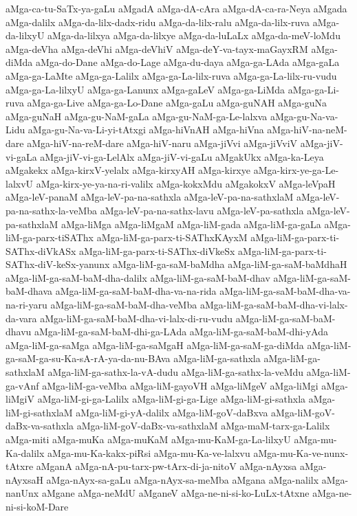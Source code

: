 {aMga-ca-tu-SaTx-ya-gaLu
aMgadA
aMga-dA-cAra
aMga-dA-ca-ra-Neya
aMgada
aMga-dalilx
aMga-da-lilx-dadx-ridu
aMga-da-lilx-ralu
aMga-da-lilx-ruva
aMga-da-lilxyU
aMga-da-lilxya
aMga-da-lilxye
aMga-da-luLaLx
aMga-da-meV-loMdu
aMga-deVha
aMga-deVhi
aMga-deVhiV
aMga-deY-va-tayx-maGayxRM
aMga-diMda
aMga-do-Dane
aMga-do-Lage
aMga-du-daya
aMga-ga-LAda
aMga-gaLa
aMga-ga-LaMte
aMga-ga-Lalilx
aMga-ga-La-lilx-ruva
aMga-ga-La-lilx-ru-vudu
aMga-ga-La-lilxyU
aMga-ga-Lanunx
aMga-gaLeV
aMga-ga-LiMda
aMga-ga-Li-ruva
aMga-ga-Live
aMga-ga-Lo-Dane
aMga-gaLu
aMga-guNAH
aMga-guNa
aMga-guNaH
aMga-gu-NaM-gaLa
aMga-gu-NaM-ga-Le-lalxva
aMga-gu-Na-va-Lidu
aMga-gu-Na-va-Li-yi-tAtxgi
aMga-hiVnAH
aMga-hiVna
aMga-hiV-na-neM-dare
aMga-hiV-na-reM-dare
aMga-hiV-naru
aMga-jiVvi
aMga-jiVviV
aMga-jiV-vi-gaLa
aMga-jiV-vi-ga-LelAlx
aMga-jiV-vi-gaLu
aMgakUkx
aMga-ka-Leya
aMgakekx
aMga-kirxV-yelalx
aMga-kirxyAH
aMga-kirxye
aMga-kirx-ye-ga-Le-lalxvU
aMga-kirx-ye-ya-na-ri-valilx
aMga-kokxMdu
aMgakokxV
aMga-leVpaH
aMga-leV-panaM
aMga-leV-pa-na-sathxla
aMga-leV-pa-na-sathxlaM
aMga-leV-pa-na-sathx-la-veMba
aMga-leV-pa-na-sathx-lavu
aMga-leV-pa-sathxla
aMga-leV-pa-sathxlaM
aMga-liMga
aMga-liMgaM
aMga-liM-gada
aMga-liM-ga-gaLa
aMga-liM-ga-parx-tiSAThx
aMga-liM-ga-parx-ti-SAThxKAyxM
aMga-liM-ga-parx-ti-SAThx-diVkASx
aMga-liM-ga-parx-ti-SAThx-diVkeSx
aMga-liM-ga-parx-ti-SAThx-diV-keSx-yanunx
aMga-liM-ga-saM-baMdha
aMga-liM-ga-saM-baMdhaH
aMga-liM-ga-saM-baM-dha-dalilx
aMga-liM-ga-saM-baM-dhav
aMga-liM-ga-saM-baM-dhava
aMga-liM-ga-saM-baM-dha-va-na-rida
aMga-liM-ga-saM-baM-dha-va-na-ri-yaru
aMga-liM-ga-saM-baM-dha-veMba
aMga-liM-ga-saM-baM-dha-vi-lalx-da-vara
aMga-liM-ga-saM-baM-dha-vi-lalx-di-ru-vudu
aMga-liM-ga-saM-baM-dhavu
aMga-liM-ga-saM-baM-dhi-ga-LAda
aMga-liM-ga-saM-baM-dhi-yAda
aMga-liM-ga-saMga
aMga-liM-ga-saMgaH
aMga-liM-ga-saM-ga-diMda
aMga-liM-ga-saM-ga-su-Ka-sA-rA-ya-da-nu-BAva
aMga-liM-ga-sathxla
aMga-liM-ga-sathxlaM
aMga-liM-ga-sathx-la-vA-dudu
aMga-liM-ga-sathx-la-veMdu
aMga-liM-ga-vAnf
aMga-liM-ga-veMba
aMga-liM-gayoVH
aMga-liMgeV
aMga-liMgi
aMga-liMgiV
aMga-liM-gi-ga-Lalilx
aMga-liM-gi-ga-Lige
aMga-liM-gi-sathxla
aMga-liM-gi-sathxlaM
aMga-liM-gi-yA-dalilx
aMga-liM-goV-daBxva
aMga-liM-goV-daBx-va-sathxla
aMga-liM-goV-daBx-va-sathxlaM
aMga-maM-tarx-ga-Lalilx
aMga-miti
aMga-muKa
aMga-muKaM
aMga-mu-KaM-ga-La-lilxyU
aMga-mu-Ka-dalilx
aMga-mu-Ka-kakx-piRsi
aMga-mu-Ka-ve-lalxvu
aMga-mu-Ka-ve-nunx-tAtxre
aMganA
aMga-nA-pu-tarx-pw-tArx-di-ja-nitoV
aMga-nAyxsa
aMga-nAyxsaH
aMga-nAyx-sa-gaLu
aMga-nAyx-sa-meMba
aMgana
aMga-nalilx
aMga-nanUnx
aMgane
aMga-neMdU
aMganeV
aMga-ne-ni-si-ko-LuLx-tAtxne
aMga-ne-ni-si-koM-Dare
}
